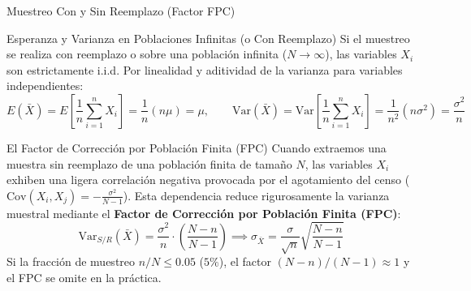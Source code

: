 \documentclass[10pt, aspectratio=169]{beamer}
\begin{document}
\begin{frame}{Muestreo Con y Sin Reemplazo (Factor FPC)}
  \fontsize{7.5pt}{9pt}\selectfont
  \begin{block}{Esperanza y Varianza en Poblaciones Infinitas (o Con Reemplazo)}
    \fontsize{7.5pt}{9pt}\selectfont
    Si el muestreo se realiza con reemplazo o sobre una población infinita ($N \to \infty$), las variables $X_i$ son estrictamente i.i.d. Por linealidad y aditividad de la varianza para variables independientes:
    $$E(\bar{X}) = E\left[\frac{1}{n}\sum_{i=1}^n X_i\right] = \frac{1}{n}(n\mu) = \mu, \qquad \text{Var}(\bar{X}) = \text{Var}\left[\frac{1}{n}\sum_{i=1}^n X_i\right] = \frac{1}{n^2}(n\sigma^2) = \frac{\sigma^2}{n}$$
  \end{block}
  \vspace{-0.15cm}
  \pause
  \begin{alertblock}{El Factor de Corrección por Población Finita (FPC)}
    \fontsize{7.5pt}{9pt}\selectfont
    Cuando extraemos una muestra sin reemplazo de una población finita de tamaño $N$, las variables $X_i$ exhiben una ligera correlación negativa provocada por el agotamiento del censo ($\text{Cov}(X_i, X_j) = -\frac{\sigma^2}{N-1}$). Esta dependencia reduce rigurosamente la varianza muestral mediante el \textbf{Factor de Corrección por Población Finita (FPC)}:
    $$\text{Var}_{S/R}(\bar{X}) = \frac{\sigma^2}{n} \cdot \left(\frac{N-n}{N-1}\right) \implies \sigma_{\bar{X}} = \frac{\sigma}{\sqrt{n}} \sqrt{\frac{N-n}{N-1}}$$
    Si la fracción de muestreo $n/N \le 0.05$ ($5\%$), el factor $(N-n)/(N-1) \approx 1$ y el FPC se omite en la práctica.
  \end{alertblock}
\end{frame}
\end{document}
